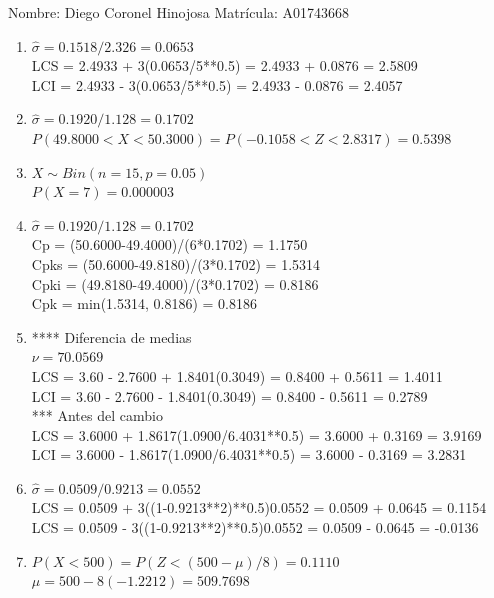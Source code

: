 \documentclass[8pt]{report}
\begin{document}
 \newpage

Nombre: \underline{\hspace*{.2in}}
Diego Coronel Hinojosa
\underline{\hspace*{.2in}} \quad Matr\'icula:\underline{\hspace*{.2in}}
A01743668
\underline{\hspace*{.2in}} \\

\begin{enumerate}
\item $\hat\sigma = 0.1518/2.326 = 0.0653$\\
LCS = 2.4933 + 3(0.0653/5**0.5) = 2.4933 + 0.0876 = 2.5809\\
LCI = 2.4933 - 3(0.0653/5**0.5) = 2.4933 - 0.0876 = 2.4057
\item $\hat\sigma = 0.1920/1.128 = 0.1702$\\
$P(49.8000 < X < 50.3000) = P(-0.1058 < Z < 2.8317) = 0.5398$\\
\item $X \sim Bin(n=15, p=0.05)$\\
$P(X = 7) = 0.000003$
\item $\hat\sigma = 0.1920/1.128 = 0.1702$\\
Cp = (50.6000-49.4000)/(6*0.1702) = 1.1750\\
Cpks = (50.6000-49.8180)/(3*0.1702) = 1.5314\\
Cpki = (49.8180-49.4000)/(3*0.1702) = 0.8186\\
Cpk = min(1.5314, 0.8186) = 0.8186
\item **** Diferencia de medias\\
$\nu = 70.0569$\\
LCS = 3.60 - 2.7600 + 1.8401(0.3049) = 0.8400 + 0.5611 = 1.4011\\
LCI = 3.60 - 2.7600 - 1.8401(0.3049) = 0.8400 - 0.5611 = 0.2789\\
*** Antes del cambio\\
LCS = 3.6000 + 1.8617(1.0900/6.4031**0.5) = 3.6000 + 0.3169 = 3.9169\\
LCI = 3.6000 - 1.8617(1.0900/6.4031**0.5) = 3.6000 - 0.3169 = 3.2831\\
\item $\hat\sigma = 0.0509/0.9213 = 0.0552$\\
LCS = 0.0509 + 3((1-0.9213**2)**0.5)0.0552 = 0.0509 + 0.0645 = 0.1154\\
LCS = 0.0509 - 3((1-0.9213**2)**0.5)0.0552 = 0.0509 - 0.0645 = -0.0136
\item $P(X < 500) = P(Z < (500-\mu)/8) = 0.1110$\\
$\mu = 500 - 8(-1.2212) = 509.7698$\\
\end{enumerate}
\end{document}
